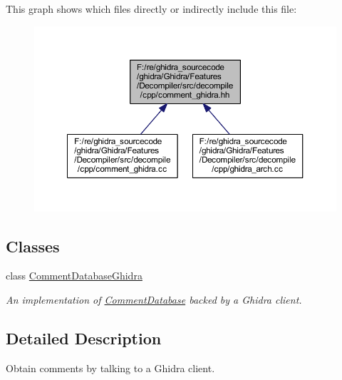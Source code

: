 This graph shows which files directly or indirectly include this file\+:
\nopagebreak
\begin{figure}[H]
\begin{center}
\leavevmode
\includegraphics[width=350pt]{comment__ghidra_8hh__dep__incl}
\end{center}
\end{figure}
\subsection*{Classes}
\begin{DoxyCompactItemize}
\item 
class \mbox{\hyperlink{class_comment_database_ghidra}{Comment\+Database\+Ghidra}}
\begin{DoxyCompactList}\small\item\em An implementation of \mbox{\hyperlink{class_comment_database}{Comment\+Database}} backed by a Ghidra client. \end{DoxyCompactList}\end{DoxyCompactItemize}


\subsection{Detailed Description}
Obtain comments by talking to a Ghidra client. 

